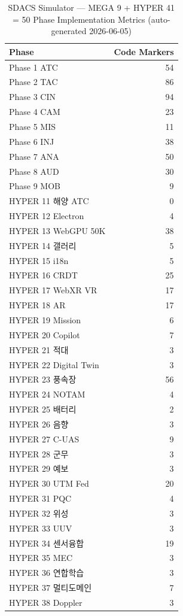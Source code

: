 \begin{table}[h]
\centering
\caption{SDACS Simulator — MEGA 9 + HYPER 41 = 50 Phase Implementation Metrics (auto-generated 2026-06-05)}
\label{tab:sdacs-50-phases}
\begin{tabular}{lr}
\hline
Phase & Code Markers \\
\hline
Phase 1 ATC & 54 \\
Phase 2 TAC & 86 \\
Phase 3 CIN & 94 \\
Phase 4 CAM & 23 \\
Phase 5 MIS & 11 \\
Phase 6 INJ & 38 \\
Phase 7 ANA & 50 \\
Phase 8 AUD & 30 \\
Phase 9 MOB & 9 \\
HYPER 11 해양 ATC & 0 \\
HYPER 12 Electron & 4 \\
HYPER 13 WebGPU 50K & 38 \\
HYPER 14 갤러리 & 5 \\
HYPER 15 i18n & 5 \\
HYPER 16 CRDT & 25 \\
HYPER 17 WebXR VR & 17 \\
HYPER 18 AR & 17 \\
HYPER 19 Mission & 6 \\
HYPER 20 Copilot & 7 \\
HYPER 21 적대 & 3 \\
HYPER 22 Digital Twin & 3 \\
HYPER 23 풍속장 & 56 \\
HYPER 24 NOTAM & 4 \\
HYPER 25 배터리 & 2 \\
HYPER 26 음향 & 3 \\
HYPER 27 C-UAS & 9 \\
HYPER 28 군무 & 3 \\
HYPER 29 예보 & 3 \\
HYPER 30 UTM Fed & 20 \\
HYPER 31 PQC & 4 \\
HYPER 32 위성 & 3 \\
HYPER 33 UUV & 3 \\
HYPER 34 센서융합 & 19 \\
HYPER 35 MEC & 3 \\
HYPER 36 연합학습 & 3 \\
HYPER 37 멀티도메인 & 7 \\
HYPER 38 Doppler & 3 \\

\end{tabular}
\end{table}
